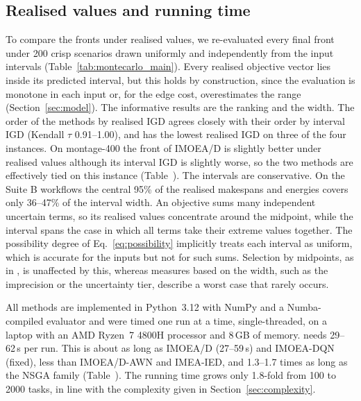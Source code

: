 

\subsection{Realised values and running time}
\label{sec:montecarlo}
\label{sec:runtime}
To compare the fronts under realised values, we re-evaluated every final front under 200 crisp scenarios drawn
uniformly and independently from the input intervals (Table~\ref{tab:montecarlo_main}). Every realised objective
vector lies inside its predicted interval, but this holds by construction, since the evaluation is monotone in each
input or, for the edge cost, overestimates the range (Section~\ref{sec:model}). The informative results are the
ranking and the width. The order of the methods by realised IGD agrees closely with their order by interval IGD
(Kendall $\tau$ 0.91--1.00), and \ours{} has the lowest realised IGD on three of the four instances. On montage-400 the
front of IMOEA/D is slightly better under realised values although its interval IGD is slightly worse, so the two
methods are effectively tied on this instance (Table~). The intervals are conservative. On the
Suite B workflows the central 95\% of the realised makespans and energies covers only 36--47\% of the interval width.
An objective sums many independent uncertain terms, so its realised values concentrate around the midpoint, while the
interval spans the case in which all terms take their extreme values together. The possibility degree of
Eq.~\eqref{eq:possibility} implicitly treats each interval as uniform, which is accurate for the inputs but not for
such sums. Selection by midpoints, as in \ours{}, is unaffected by this, whereas measures based on the width, such as
the imprecision or the uncertainty tier, describe a worst case that rarely occurs.



All methods are implemented in Python~3.12 with NumPy and a Numba-compiled evaluator and were timed one run at a
time, single-threaded, on a laptop with an AMD Ryzen~7 4800H processor and 8\,GB of memory. \ours{} needs 29--62\,s
per run. This is about as long as IMOEA/D (27--59\,s) and IMOEA-DQN (fixed), less than
IMOEA/D-AWN and IMEA-IED, and 1.3--1.7 times as long as the NSGA family (Table~). The running time
grows only 1.8-fold from 100 to 2000 tasks, in line with the complexity given in Section~\ref{sec:complexity}.

